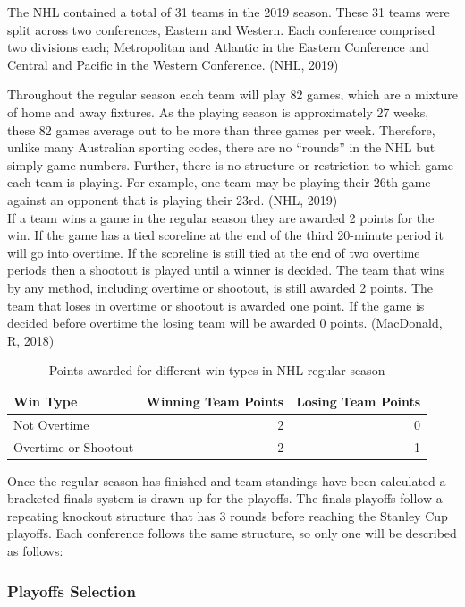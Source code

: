 \documentclass[]{article}
\begin{document}
The NHL contained a total of 31 teams in the 2019 season. These 31 teams
were split across two conferences, Eastern and Western. Each conference
comprised two divisions each; Metropolitan and Atlantic in the Eastern
Conference and Central and Pacific in the Western Conference. (NHL,
2019)

Throughout the regular season each team will play 82 games, which are a
mixture of home and away fixtures. As the playing season is
approximately 27 weeks, these 82 games average out to be more than three
games per week. Therefore, unlike many Australian sporting codes, there
are no ``rounds'' in the NHL but simply game numbers. Further, there is
no structure or restriction to which game each team is playing. For
example, one team may be playing their 26th game against an opponent
that is playing their 23rd. (NHL, 2019)\\
If a team wins a game in the regular season they are awarded 2 points
for the win. If the game has a tied scoreline at the end of the third
20-minute period it will go into overtime. If the scoreline is still
tied at the end of two overtime periods then a shootout is played until
a winner is decided. The team that wins by any method, including
overtime or shootout, is still awarded 2 points. The team that loses in
overtime or shootout is awarded one point. If the game is decided before
overtime the losing team will be awarded 0 points. (MacDonald, R, 2018)

\begin{table}[t]

\caption{\label{tab:unnamed-chunk-2}Points awarded for different win types in NHL regular season}
\centering
\begin{tabular}{l|r|r}
\hline
Win Type & Winning Team Points & Losing Team Points\\
\hline
Not Overtime & 2 & 0\\
\hline
Overtime or Shootout & 2 & 1\\
\hline
\end{tabular}
\end{table}

Once the regular season has finished and team standings have been
calculated a bracketed finals system is drawn up for the playoffs. The
finals playoffs follow a repeating knockout structure that has 3 rounds
before reaching the Stanley Cup playoffs. Each conference follows the
same structure, so only one will be described as follows:

\subsubsection{Playoffs Selection}\label{playoffs-selection}
\end{document}
